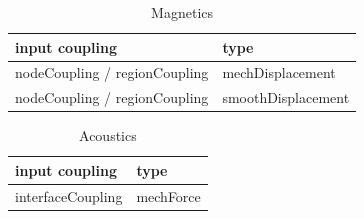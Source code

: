 \begin{table}[htb]
\begin{center}
\caption{Magnetics}
\bigskip
\begin{tabular}{ll}
\toprule
input coupling    & type \\
\midrule
nodeCoupling / regionCoupling & mechDisplacement \\
nodeCoupling / regionCoupling & smoothDisplacement \\
\bottomrule
\end{tabular}
\end{center}
\end{table}

\begin{table}[htb]
\begin{center}
\caption{Acoustics}
\bigskip
\begin{tabular}{ll}
\toprule
input coupling    & type \\
\midrule
interfaceCoupling      & mechForce \\
\bottomrule
\end{tabular}
\end{center}
\end{table}

\newpage



